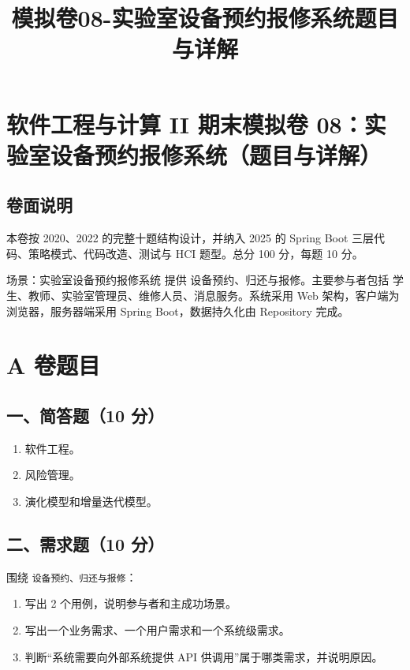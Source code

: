 \documentclass[UTF8,zihao=-4]{ctexart}
\title{模拟卷08-实验室设备预约报修系统题目与详解}
\author{}
\date{}
\begin{document}
\maketitle
\setcounter{tocdepth}{1}
\tableofcontents
\newpage
\section{软件工程与计算 II 期末模拟卷 08：实验室设备预约报修系统（题目与详解）}


\subsection{卷面说明}


本卷按 2020、2022 的完整十题结构设计，并纳入 2025 的 Spring Boot 三层代码、策略模式、代码改造、测试与 HCI 题型。总分 100 分，每题 10 分。


场景：实验室设备预约报修系统 提供 设备预约、归还与报修。主要参与者包括 学生、教师、实验室管理员、维修人员、消息服务。系统采用 Web 架构，客户端为浏览器，服务器端采用 Spring Boot，数据持久化由 Repository 完成。


\section{A 卷题目}


\subsection{一、简答题（10 分）}


\begin{enumerate}
\item 软件工程。
\item 风险管理。
\item 演化模型和增量迭代模型。
\end{enumerate}


\subsection{二、需求题（10 分）}


围绕 \texttt{设备预约、归还与报修}：


\begin{enumerate}
\item 写出 2 个用例，说明参与者和主成功场景。
\item 写出一个业务需求、一个用户需求和一个系统级需求。
\item 判断“系统需要向外部系统提供 API 供调用”属于哪类需求，并说明原因。
\end{enumerate}
\end{document}
